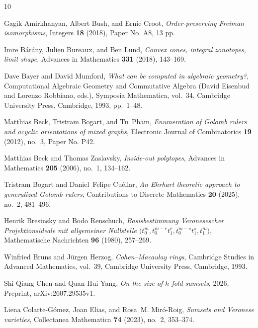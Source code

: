 \documentclass[11pt,reqno]{amsart}
\theoremstyle{definition}
\theoremstyle{remark}
\begin{document}

\enlargethispage{2\baselineskip}
\begin{sloppypar}
\providecommand{\bysame}{\leavevmode\hbox to3em{\hrulefill}\thinspace}
\providecommand{\href}[2]{#2}
\begin{thebibliography}{10}

Gagik Amirkhanyan, Albert Bush, and Ernie Croot, \emph{Order-preserving {Freiman} isomorphisms}, Integers \textbf{18} (2018), Paper No. A8, 13 pp.

Imre B{\'a}r{\'a}ny, Julien Bureaux, and Ben Lund, \emph{Convex cones, integral zonotopes, limit shape}, Advances in Mathematics \textbf{331} (2018), 143--169.

Dave Bayer and David Mumford, \emph{What can be computed in algebraic geometry?}, Computational Algebraic Geometry and Commutative Algebra (David Eisenbud and Lorenzo Robbiano, eds.), Symposia Mathematica, vol.~34, Cambridge University Press, Cambridge, 1993, pp.~1--48.

Matthias Beck, Tristram Bogart, and Tu~Pham, \emph{Enumeration of {Golomb} rulers and acyclic orientations of mixed graphs}, Electronic Journal of Combinatorics \textbf{19} (2012), no.~3, Paper No. P42.

Matthias Beck and Thomas Zaslavsky, \emph{Inside-out polytopes}, Advances in Mathematics \textbf{205} (2006), no.~1, 134--162.

Tristram Bogart and Daniel~Felipe Cu\'ellar, \emph{An {Ehrhart} theoretic approach to generalized {Golomb} rulers}, Contributions to Discrete Mathematics \textbf{20} (2025), no.~2, 481--496.

Henrik Bresinsky and Bodo Renschuch, \emph{Basisbestimmung {V}eronesescher {P}rojektionsideale mit allgemeiner {N}ullstelle $\bigl(t_0^m,t_0^{m-r}t_1^r,t_0^{m-s}t_1^s,t_1^m\bigr)$}, Mathematische Nachrichten \textbf{96} (1980), 257--269.

Winfried Bruns and J{\"u}rgen Herzog, \emph{{Cohen--Macaulay} rings}, Cambridge Studies in Advanced Mathematics, vol.~39, Cambridge University Press, Cambridge, 1993.

Shi-Qiang Chen and Quan-Hui Yang, \emph{On the size of {$h$}-fold sumsets}, 2026, Preprint, arXiv:2607.29535v1.

Liena Colarte-G{\'o}mez, Joan Elias, and Rosa~M. Mir{\'o}-Roig, \emph{Sumsets and {Veronese} varieties}, Collectanea Mathematica \textbf{74} (2023), no.~2, 353--374.


\end{thebibliography}
\end{sloppypar}
\end{document}
